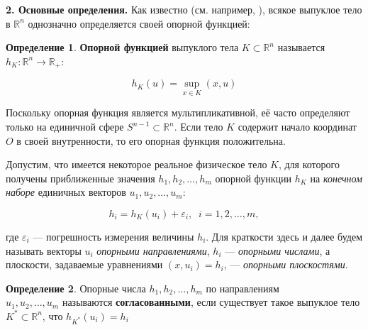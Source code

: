 \documentclass[a4paper, 10pt]{article}
\theoremstyle{definition}
\newtheorem{SmartDefinition}{Определение}
\theoremstyle{plain}
\theoremstyle{plain}
\begin{document}
\textbf{2. Основные определения.} Как известно (см. например,
\cite{GhoshKumar}), всякое выпуклое тело в $\mathbb{R}^{n}$
однозначно определяется своей опорной функцией:

\begin{SmartDefinition}
 \label{def:support-function}
 \textbf{Опорной функцией} выпуклого тела $K \subset \mathbb{R}^{n}$
 называется
 $h_{K}: \mathbb{R}^{n} \to \mathbb{R}_{+}$:

 \begin{equation}h_{K}(u) = \sup \limits_{x \in K}(x, u)\end{equation}
\end{SmartDefinition}

Поскольку опорная функция является мультипликативной, её часто определяют только
на единичной сфере $S^{n - 1} \subset \mathbb{R}^{n}$. Если тело $K$ содержит
начало координат $O$ в своей внутренности, то его опорная функция положительна.

Допустим, что имеется некоторое реальное физическое тело $K$, для которого
получены приближенные значения $h_{1}, h_{2}, \ldots, h_{m}$ опорной функции
$h_{K}$ на \textit{конечном наборе} единичных векторов
$u_{1}, u_{2}, \ldots, u_{m}$:

\begin{equation}
 h_{i} = h_{K}(u_{i}) + \varepsilon_{i}, \;\; i = 1, 2, \ldots, m,
\end{equation}

где $\varepsilon_{i}$ --- погрешность измерения величины $h_{i}$. Для краткости
здесь и далее будем называть векторы $u_{i}$ \textit{опорными направлениями},
$h_{i}$ --- \textit{опорными числами}, а плоскости, задаваемые уравнениями
$(x, u_{i}) = h_{i}$, --- \textit{опорными плоскостями}.

\begin{SmartDefinition}
 \label{def:consistency}
 Опорные числа $h_{1}, h_{2}, \ldots, h_{m}$ по направлениям \\
 $u_{1}, u_{2}, \ldots, u_{m}$ называются \textbf{согласованными}, если
 существует такое выпуклое тело  $K^{*} \subset \mathbb{R}^{n}$, что
 $h_{K^{*}}(u_{i}) = h_{i}$
\end{SmartDefinition}
\end{document}

